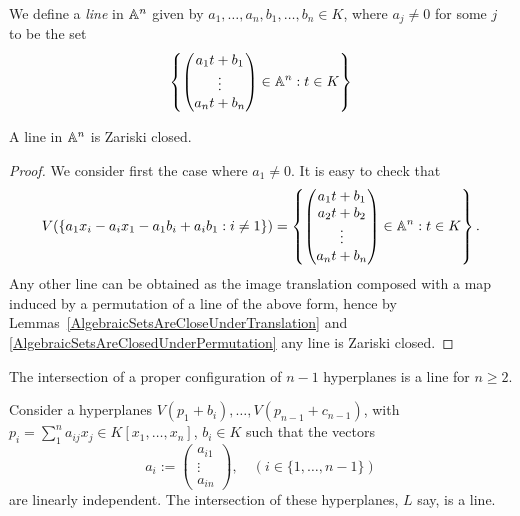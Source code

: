 \begin{definition}\label{GeneralDefinitionOfALine}
    We define a \textit{line} in $\mathbb{A}^n$ given by $a_1,\dots,a_n,b_1,\dots,b_n\in K$, where $a_j \neq 0$ for some $j$ to be the set 
    $$\left\{ \begin{pmatrix} a_1t + b_1\\ \vdots \\ a_nt+b_n \end{pmatrix}\in\mathbb{A}^n : t \in K \right\}$$
\end{definition}
\begin{lemma}\label{LineIsZariskiClosed}
    A line in $\mathbb{A}^n$ is Zariski closed. 
\end{lemma}
\begin{proof}
    We consider first the case where $a_1\neq0$. It is easy to check that 
    $$V(\{a_1x_i - a_ix_1-a_1b_i+a_ib_1 : i\neq 1\}) = \left\{ \begin{pmatrix} a_1t+b_1\\ a_2t+b_2\\ \vdots \\ a_nt+b_n \end{pmatrix}\in\mathbb{A}^n : t \in K \right\}.$$
    Any other line can be obtained as the image translation composed with a map induced by a permutation of a line of the above form, hence by Lemmas~\ref{AlgebraicSetsAreCloseUnderTranslation} and \ref{AlgebraicSetsAreClosedUnderPermutation} any line is Zariski closed.
\end{proof}
The intersection of a proper configuration of $n-1$ hyperplanes is a line for $n\geq 2$.
\begin{proposition}
    Consider a hyperplanes $V(p_1+b_i),\dots,V(p_{n-1}+c_{n-1})$, with $p_i = \sum_1^n a_{ij}x_j\in K[x_1,\dots,x_n]$, $b_i\in K$ such that the vectors 
        $$a_i:=\begin{pmatrix}
            a_{i1}\\
            \vdots\\
            a_{in}
        \end{pmatrix}, \quad (i\in \{1,\dots,n-1\}) $$
    are linearly independent. The intersection of these hyperplanes, $L$ say, is a line.     
\end{proposition}
